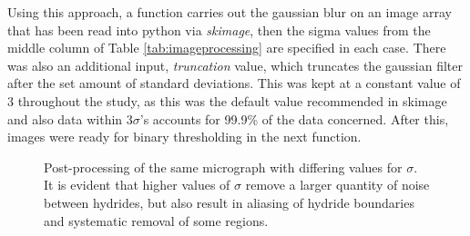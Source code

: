 \documentclass{article}
\begin{document}
	Using this approach, a function carries out the gaussian blur on an image array that has been read into python via \textit{skimage}, then the sigma values from the middle column of Table \ref{tab:imageprocessing} are specified in each case. There was also an additional input, \textit{truncation} value, which truncates the gaussian filter after the set amount of standard deviations. This was kept at a constant value of 3 throughout the study, as this was the default value recommended in skimage and also data within $3\sigma$'s accounts for 99.9\% of the data concerned. After this, images were ready for binary thresholding in the next function.
	\begin{figure}[h]
		\centering
		\hfill
		\caption{Post-processing of the same micrograph with differing values for $\sigma$. It is evident that higher values of $\sigma$ remove a larger quantity of noise between hydrides, but also result in aliasing of hydride boundaries and systematic removal of some regions.}
		\label{fig:chu1gauss}
	\end{figure}
	
\end{document}
